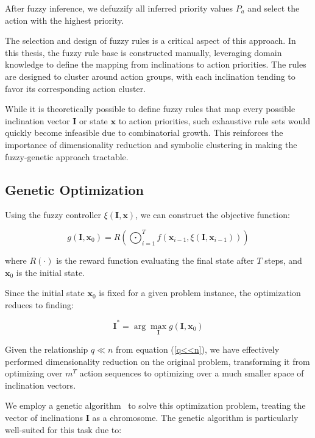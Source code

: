 \documentclass[11pt, a4paper]{article}
\begin{document}
After fuzzy inference, we defuzzify all inferred priority values $P_a$ and select the action with the highest priority.

The selection and design of fuzzy rules is a critical aspect of this approach. In this thesis, the fuzzy rule base is constructed manually, leveraging domain knowledge to define the mapping from inclinations to action priorities. The rules are designed to cluster around action groups, with each inclination tending to favor its corresponding action cluster.

While it is theoretically possible to define fuzzy rules that map every possible inclination vector $\mathbf{I}$ or state $\mathbf{x}$ to action priorities, such exhaustive rule sets would quickly become infeasible due to combinatorial growth. This reinforces the importance of dimensionality reduction and symbolic clustering in making the fuzzy-genetic approach tractable.

\subsection{Genetic Optimization}

Using the fuzzy controller $\xi(\mathbf{I}, \mathbf{x})$, we can construct the objective function:

\begin{equation}
    g(\mathbf{I}, \mathbf{x}_0) = R\left(\bigodot_{i=1}^{T} f(\mathbf{x}_{i-1}, \xi(\mathbf{I}, \mathbf{x}_{i-1}))\right)
\end{equation}

where $R(\cdot)$ is the reward function evaluating the final state after $T$ steps, and $\mathbf{x}_0$ is the initial state.

Since the initial state $\mathbf{x}_0$ is fixed for a given problem instance, the optimization reduces to finding:

\begin{equation}
    \mathbf{I}^* = \arg \max_{\mathbf{I}} g(\mathbf{I}, \mathbf{x}_0)
\end{equation}

Given the relationship $q \ll n$ from equation (\ref{q<<n}), we have effectively performed dimensionality reduction on the original problem, transforming it from optimizing over $m^T$ action sequences to optimizing over a much smaller space of inclination vectors.

We employ a genetic algorithm~\cite{mitchell1999geneticalgorithms} to solve this optimization problem, treating the vector of inclinations $\mathbf{I}$ as a chromosome. The genetic algorithm is particularly well-suited for this task due to:
\end{document}
